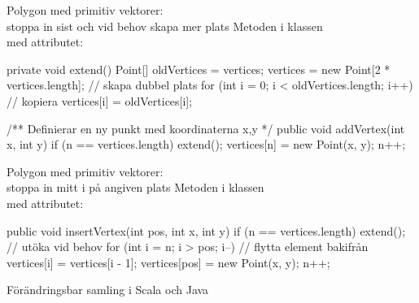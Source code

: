 \begin{Slide}{Polygon med primitiv vektorer: \\stoppa in sist och vid behov skapa mer plats}
Metoden  i klassen \\med attributet:  
\begin{Code}[numberstyle=,numbers=left]
    private void extend(){
        Point[] oldVertices = vertices;
        vertices = new Point[2 * vertices.length]; // skapa dubbel plats
        for (int i = 0; i < oldVertices.length; i++) {  // kopiera
            vertices[i] = oldVertices[i];
        }        
    }

    /** Definierar en ny punkt med koordinaterna x,y */
    public void addVertex(int x, int y) {
        if (n == vertices.length) extend();
        vertices[n] = new Point(x, y);
        n++;
    }
\end{Code}
\end{Slide}


\begin{Slide}{Polygon med primitiv vektorer: \\stoppa in mitt i på angiven plats }
Metoden  i klassen \\med attributet:  
\begin{Code}[numberstyle=,numbers=left]
    public void insertVertex(int pos, int x, int y) {
        if (n == vertices.length) extend();   // utöka vid behov
        for (int i = n; i > pos; i--) {       // flytta element bakifrån
            vertices[i] = vertices[i - 1];
        }
        vertices[pos] = new Point(x, y);
        n++;
    }
\end{Code}
\end{Slide}




\begin{Slide}{Förändringsbar samling i Scala och Java}
\end{Slide}


